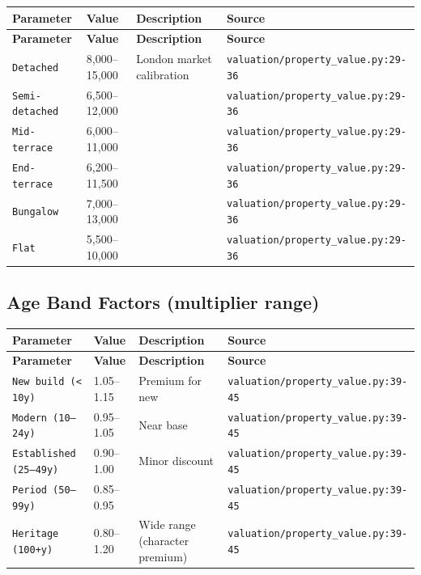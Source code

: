 \documentclass[11pt,a4paper]{article}
\begin{document}
\begin{longtable}{p{4cm}p{4cm}p{5.5cm}p{3.5cm}}
    \toprule
    \textbf{Parameter} & \textbf{Value} & \textbf{Description} & \textbf{Source} \\
    \midrule
    \endfirsthead
    \toprule
    \textbf{Parameter} & \textbf{Value} & \textbf{Description} & \textbf{Source} \\
    \midrule
    \endhead
    \bottomrule
    \endfoot
    \texttt{Detached} & 8,000--15,000 & London market calibration & {\scriptsize \texttt{valuation/property\_value.py:29-36}} \\
    \texttt{Semi-detached} & 6,500--12,000 &  & {\scriptsize \texttt{valuation/property\_value.py:29-36}} \\
    \texttt{Mid-terrace} & 6,000--11,000 &  & {\scriptsize \texttt{valuation/property\_value.py:29-36}} \\
    \texttt{End-terrace} & 6,200--11,500 &  & {\scriptsize \texttt{valuation/property\_value.py:29-36}} \\
    \texttt{Bungalow} & 7,000--13,000 &  & {\scriptsize \texttt{valuation/property\_value.py:29-36}} \\
    \texttt{Flat} & 5,500--10,000 &  & {\scriptsize \texttt{valuation/property\_value.py:29-36}} \\
\end{longtable}

\subsection{Age Band Factors (multiplier range)}

\begin{longtable}{p{4cm}p{4cm}p{5.5cm}p{3.5cm}}
    \toprule
    \textbf{Parameter} & \textbf{Value} & \textbf{Description} & \textbf{Source} \\
    \midrule
    \endfirsthead
    \toprule
    \textbf{Parameter} & \textbf{Value} & \textbf{Description} & \textbf{Source} \\
    \midrule
    \endhead
    \bottomrule
    \endfoot
    \texttt{New build (< 10y)} & 1.05--1.15 & Premium for new & {\scriptsize \texttt{valuation/property\_value.py:39-45}} \\
    \texttt{Modern (10--24y)} & 0.95--1.05 & Near base & {\scriptsize \texttt{valuation/property\_value.py:39-45}} \\
    \texttt{Established (25--49y)} & 0.90--1.00 & Minor discount & {\scriptsize \texttt{valuation/property\_value.py:39-45}} \\
    \texttt{Period (50--99y)} & 0.85--0.95 &  & {\scriptsize \texttt{valuation/property\_value.py:39-45}} \\
    \texttt{Heritage (100+y)} & 0.80--1.20 & Wide range (character premium) & {\scriptsize \texttt{valuation/property\_value.py:39-45}} \\
\end{longtable}
\end{document}
